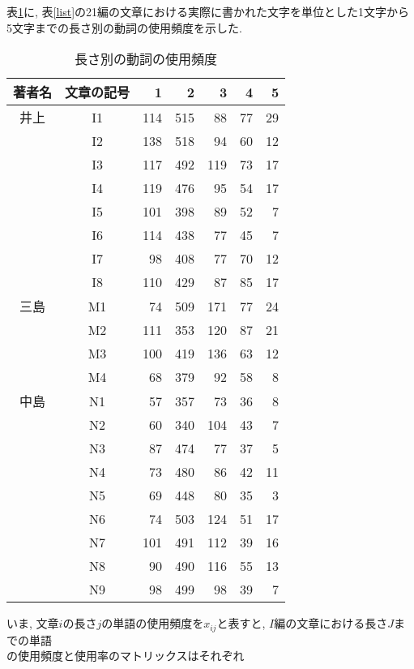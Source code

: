 表\ref{wlf}に, 表\ref{list}の21編の文章における実際に書かれた文字を単位とした1文字から5文字までの長さ別の動詞の使用頻度を示した. 


\begin{table}[htb]
\caption{\dg 長さ別の動詞の使用頻度}\label{wlf}
\begin{center}
\small{
\begin{tabular}{c c r  r r r r }\hline
著者名  & 文章の記号& 1 & 2 & 3 & 4 & 5 \\ \hline
井上    & I1  &   114&  515&   88&   77&   29  \\
        & I2  &   138&  518&   94&   60&   12 \\ 
        & I3  &   117&  492&  119&   73&   17\\ 
        & I4  &   119&  476&   95&   54&   17 \\ 
        & I5  &   101&  398&   89&   52&    7\\ 
        & I6  &   114&  438&   77&   45&    7\\ 
        & I7  &    98&  408&   77&   70&   12\\ 
        & I8  &   110&  429&   87&   85&   17\\ 
三島    & M1  &    74&  509&  171&   77&   24  \\
        & M2  &   111&  353&  120&   87&   21\\
        & M3  &   100&  419&  136&   63&   12\\
        & M4  &    68&  379&   92&   58&    8\\
中島    & N1  &    57&  357&   73&   36&    8  \\
        & N2  &    60&  340&  104&   43&    7\\
        & N3  &    87&  474&   77&   37&    5\\
        & N4  &    73&  480&   86&   42&   11 \\
        & N5  &    69&  448&   80&   35&    3\\
        & N6  &    74&  503&  124&   51&   17\\
        & N7  &   101&  491&  112&   39&   16 \\
        & N8  &    90&  490&  116&   55&   13\\
        & N9  &    98&  499&   98&   39&    7\\ \hline
\end{tabular}
}
\end{center}
\end{table}

いま, \hspace{-0.15mm}文章$i$の長さ\hspace{-0.1mm}$j$の単語の使用頻度を$x_{ij}$と表すと, \hspace{-0.15mm}$I$編の文章における長さ\hspace{-0.1mm}$J$までの単語\\の使用頻度と使用率のマトリックスはそれぞれ

